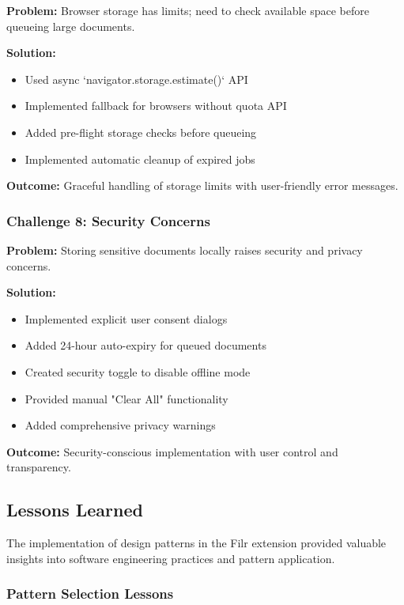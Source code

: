 \documentclass[11pt, a4paper]{article}
\theoremstyle{plain}
\theoremstyle{definition}
\begin{document}
\textbf{Problem:} Browser storage has limits; need to check available space before queueing large documents.

\textbf{Solution:}
\begin{itemize}
    \item Used async `navigator.storage.estimate()` API
    \item Implemented fallback for browsers without quota API
    \item Added pre-flight storage checks before queueing
    \item Implemented automatic cleanup of expired jobs
\end{itemize}

\textbf{Outcome:} Graceful handling of storage limits with user-friendly error messages.

\subsubsection{Challenge 8: Security Concerns}

\textbf{Problem:} Storing sensitive documents locally raises security and privacy concerns.

\textbf{Solution:}
\begin{itemize}
    \item Implemented explicit user consent dialogs
    \item Added 24-hour auto-expiry for queued documents
    \item Created security toggle to disable offline mode
    \item Provided manual "Clear All" functionality
    \item Added comprehensive privacy warnings
\end{itemize}

\textbf{Outcome:} Security-conscious implementation with user control and transparency.

\subsection{Lessons Learned}

The implementation of design patterns in the Filr extension provided valuable insights into software engineering practices and pattern application.

\subsubsection{Pattern Selection Lessons}
\end{document}
